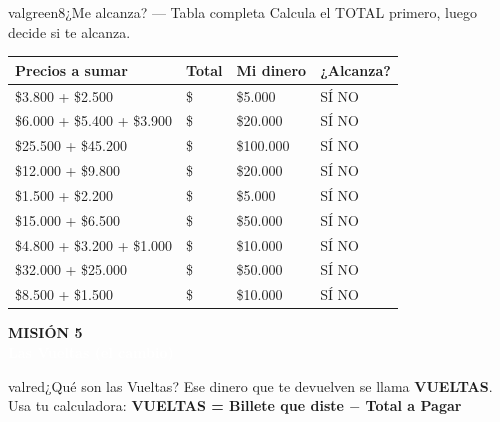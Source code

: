 \documentclass[11pt]{article}
\newcommand{\boxfill}[1][3cm]{%
	\tcbox[on line,enhanced,size=minimal,
	colframe=valblue!40, colback=linetip,
	boxrule=1pt, arc=2mm,
	boxsep=4pt, left=4pt, right=4pt, top=4pt, bottom=4pt,
	drop shadow={opacity=0.10}]%
	{\makebox[#1]{\vphantom{Hg}}}}
\newcommand{\casilla}{%
	\tcbox[on line,enhanced,size=minimal,
	colframe=valdark!50, colback=white,
	boxrule=1.2pt, arc=2mm,
	boxsep=3pt, left=2pt, right=2pt, top=2pt, bottom=2pt]%
	{\makebox[0.65cm]{\vphantom{X}}}}
\newcommand{\misionbanner}[4]{%
	\par\vspace{0.6cm}
	\begin{tcolorbox}[enhanced,
		colback=#1, colframe=#1,
		arc=0mm, boxrule=0pt,
		left=12pt, right=12pt, top=10pt, bottom=10pt,
		before skip=0pt, after skip=8pt,
		width=\linewidth+3.6cm, enlarge left by=-1.8cm]
		\begin{minipage}[c]{0.10\linewidth}
			\centering
			{\fontsize{30}{32}\selectfont\textcolor{white!60!#1}{#2}}
		\end{minipage}\hfill
		\begin{minipage}[c]{0.88\linewidth}
			\textcolor{white!50!#1}{\small\bfseries\MakeUppercase{Misión #3}}\\
			{\fontsize{18}{22}\selectfont\bfseries\textcolor{white}{#4}}
		\end{minipage}
\end{tcolorbox}}
\begin{document}
\begin{actividad}{valgreen}{8}{¿Me alcanza? --- Tabla completa}
	Calcula el TOTAL primero, luego decide si te alcanza.
	
	\vspace{4pt}
	\renewcommand{\arraystretch}{1.6}
	\begin{center}
		\begin{tabular}{|m{4.8cm}|m{2.5cm}|m{2.5cm}|m{3.5cm}|}
			\hline \rowcolor{valgreen!20} \textbf{Precios a sumar} & \textbf{Total} & \textbf{Mi dinero} & \textbf{¿Alcanza?} \\ \hline
			\$3.800 + \$2.500 & \$\;\boxfill[1.5cm] & \$5.000 & \casilla\;SÍ\;\casilla\;NO \\ \hline
			\$6.000 + \$5.400 + \$3.900 & \$\;\boxfill[1.5cm] & \$20.000 & \casilla\;SÍ\;\casilla\;NO \\ \hline
			\$25.500 + \$45.200 & \$\;\boxfill[1.5cm] & \$100.000 & \casilla\;SÍ\;\casilla\;NO \\ \hline
			\$12.000 + \$9.800 & \$\;\boxfill[1.5cm] & \$20.000 & \casilla\;SÍ\;\casilla\;NO \\ \hline
			\$1.500 + \$2.200 & \$\;\boxfill[1.5cm] & \$5.000 & \casilla\;SÍ\;\casilla\;NO \\ \hline
			\$15.000 + \$6.500 & \$\;\boxfill[1.5cm] & \$50.000 & \casilla\;SÍ\;\casilla\;NO \\ \hline
			\$4.800 + \$3.200 + \$1.000 & \$\;\boxfill[1.5cm] & \$10.000 & \casilla\;SÍ\;\casilla\;NO \\ \hline
			\$32.000 + \$25.000 & \$\;\boxfill[1.5cm] & \$50.000 & \casilla\;SÍ\;\casilla\;NO \\ \hline
			\$8.500 + \$1.500 & \$\;\boxfill[1.5cm] & \$10.000 & \casilla\;SÍ\;\casilla\;NO \\ \hline
		\end{tabular}
	\end{center}
\end{actividad}
	
	\misionbanner{valred}{}{5}{Las Vueltas (el cambio)}
	
	\begin{aprender}{valred}{¿Qué son las Vueltas?}
		Ese dinero que te devuelven se llama \textbf{VUELTAS}. Usa tu calculadora:
		\textbf{VUELTAS = Billete que diste \;$-$\; Total a Pagar}
	\end{aprender}
	
\end{document}
